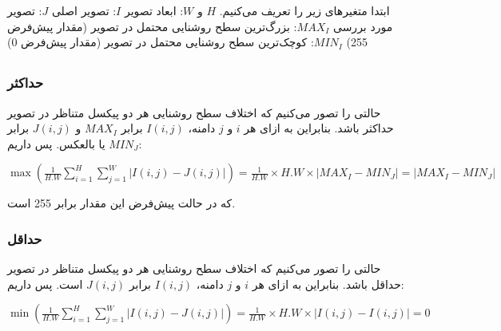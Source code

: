 \documentclass{article}
\begin{document}


\newpage


\section{}%
ابتدا متغیرهای زیر را تعریف می‌کنیم.
\newline
$H$ و $W$: ابعاد تصویر
\newline
$I$: تصویر اصلی
\newline
$J$: تصویر مورد بررسی
\newline
$MAX_{I}$: بزرگ‌ترین سطح روشنایی محتمل در تصویر (مقدار پیش‌فرض 255)
\newline
$MIN_{I}$: کوچک‌ترین سطح روشنایی محتمل در تصویر (مقدار پیش‌فرض 0)

\subsection{}
\subsubsection{حداکثر}
حالتی را تصور می‌کنیم که اختلاف سطح روشنایی هر دو پیکسل متناظر در تصویر حداکثر باشد. بنابراین به ازای هر $i$ و $j$ دامنه، $I(i, j)$ برابر $MAX_{I}$ و $J(i, j)$ برابر $MIN_{J}$ یا بالعکس. پس داریم:
\newline
\begin{latin}
$
\max(\frac{1}{H.W}\sum_{i=1}^{H}\sum_{j=1}^{W}\left| I(i, j) - J(i, j) \right|)=\frac{1}{H.W}\times H.W\times \left| MAX_{I} - MIN_{J} \right|=\left| MAX_{I} - MIN_{J} \right|
$
\end{latin}
که در حالت پیش‌فرض این مقدار برابر 255 است.
\subsubsection{حداقل}
حالتی را تصور می‌کنیم که اختلاف سطح روشنایی هر دو پیکسل متناظر در تصویر حداقل باشد. بنابراین به ازای هر $i$ و $j$ دامنه، $I(i, j)$ برابر $J(i, j)$ است. پس داریم:
\newline
\begin{latin}
$
\min(\frac{1}{H.W}\sum_{i=1}^{H}\sum_{j=1}^{W}\left| I(i, j) - J(i, j) \right|)=\frac{1}{H.W}\times H.W\times \left| I(i, j) - I(i, j) \right|=0
$
\end{latin}
\end{document}
